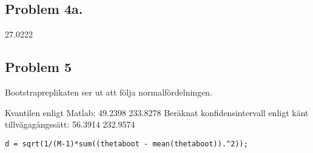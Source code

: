 \documentclass{article}
\begin{document}
\subsection*{Problem 4a.}
27.0222

\subsection*{Problem 5}

Bootstrapreplikaten ser ut att följa normalfördelningen.

Kvantilen enligt Matlab: 49.2398  233.8278
Beräknat konfidensintervall enligt känt tillvägagångssätt: 56.3914  232.9574

\begin{lstlisting}
d = sqrt(1/(M-1)*sum((thetaboot - mean(thetaboot)).^2));
\end{lstlisting}
\end{document}
